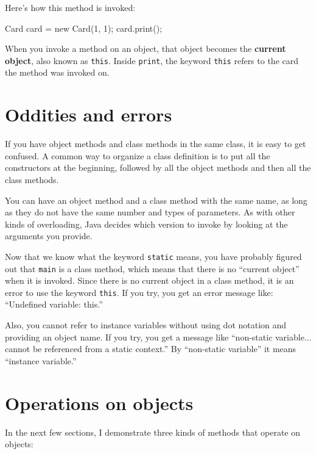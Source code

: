 Here's how this method is invoked:

\begin{code}
Card card = new Card(1, 1);
card.print();
\end{code}

When you invoke a method on an object, that object becomes the {\bf
current object}, also known as {\tt this}.  Inside {\tt print},
the keyword {\tt this} refers to the card the method was invoked on.


\section{Oddities and errors}


If you have object methods and class methods in the same class, it is
easy to get confused.  A common way to organize a class definition is
to put all the constructors at the beginning, followed by all the
object methods and then all the class methods.

You can have an object method and a class method with the same
name, as long as they do not have the same number and types of
parameters.  As with other kinds of overloading, Java decides
which version to invoke by looking at the arguments you provide.

Now that we know what the keyword {\tt static} means, you
have probably figured out that {\tt main} is a class method,
which means that there is no ``current object'' when it is invoked.
%
Since there is no current object in a class method, it is an
error to use the keyword {\tt this}.  If you try, you get
an error message like: ``Undefined variable: this.''

Also, you cannot refer to instance variables without using dot
notation and providing an object name.  If you try, you get a message
like ``non-static variable... cannot be referenced from a static
context.''  By ``non-static variable'' it means ``instance variable.''


\section{Operations on objects}
\label{objectops}

In the next few
sections, I demonstrate three kinds of methods that
operate on objects:

